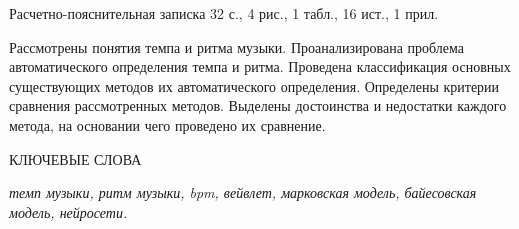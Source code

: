 
Расчетно-пояснительная записка 32 с., 4 рис., 1 табл., 16 ист., 1 прил.

Рассмотрены понятия темпа и ритма музыки. Проанализирована проблема автоматического определения темпа и ритма. Проведена классификация основных существующих методов их автоматического определения. Определены критерии сравнения рассмотренных методов. Выделены достоинства и недостатки каждого метода, на основании чего проведено их сравнение.

КЛЮЧЕВЫЕ СЛОВА

\textit{темп музыки, ритм музыки, bpm, вейвлет, марковская модель, байесовская модель, нейросети.}

\clearpage